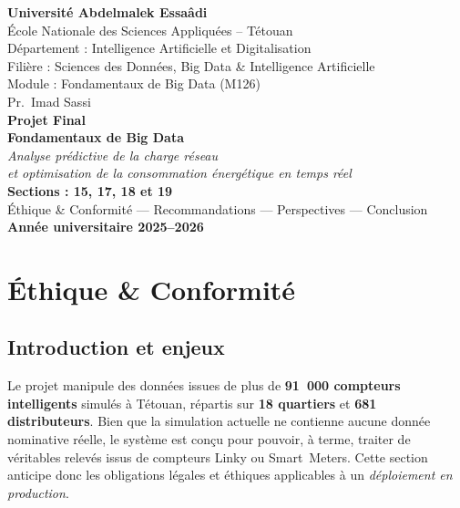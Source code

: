 \documentclass[11pt,a4paper]{article}
\begin{document}
\begin{titlepage}
  \centering
  \vspace*{2cm}
  {\large\textbf{Université Abdelmalek Essaâdi}}\\
  {\large École Nationale des Sciences Appliquées -- Tétouan}\\
  {\normalsize Département : Intelligence Artificielle et Digitalisation}\\
  {\normalsize Filière : Sciences des Données, Big Data \& Intelligence Artificielle}\\
  {\normalsize Module : Fondamentaux de Big Data (M126)}\\
  {\normalsize Pr.~Imad Sassi}\\[2.5cm]
  {\Huge\bfseries\color{sectiongreen} Projet Final}\\[0.4cm]
  {\Large\bfseries\color{titlered} Fondamentaux de Big Data}\\[1.5cm]
  {\large\itshape Analyse prédictive de la charge réseau\\et optimisation de la consommation énergétique en temps réel}\\[3cm]
  {\large\textbf{Sections : 15, 17, 18 et 19}}\\[0.5cm]
  {\large Éthique \& Conformité --- Recommandations --- Perspectives --- Conclusion}\\[3cm]
  {\large\textbf{Année universitaire 2025--2026}}\\
  \vfill
\end{titlepage}

\tableofcontents
\newpage

\section{Éthique \& Conformité}
\label{sec:ethique}

\subsection{Introduction et enjeux}

Le projet manipule des données issues de plus de \textbf{91~000 compteurs intelligents} simulés à Tétouan, répartis sur \textbf{18 quartiers} et \textbf{681 distributeurs}. Bien que la simulation actuelle ne contienne aucune donnée nominative réelle, le système est conçu pour pouvoir, à terme, traiter de véritables relevés issus de compteurs Linky ou Smart~Meters. Cette section anticipe donc les obligations légales et éthiques applicables à un \emph{déploiement en production}.
\end{document}
